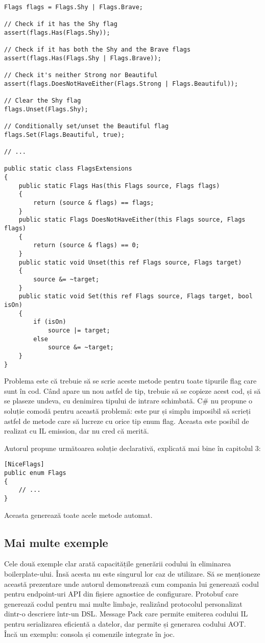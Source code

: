 \documentclass[a4paper,12pt]{report}
\begin{document}
\begin{verbatim}
Flags flags = Flags.Shy | Flags.Brave;

// Check if it has the Shy flag
assert(flags.Has(Flags.Shy));

// Check if it has both the Shy and the Brave flags
assert(flags.Has(Flags.Shy | Flags.Brave));

// Check it's neither Strong nor Beautiful
assert(flags.DoesNotHaveEither(Flags.Strong | Flags.Beautiful));

// Clear the Shy flag
flags.Unset(Flags.Shy);

// Conditionally set/unset the Beautiful flag
flags.Set(Flags.Beautiful, true);

// ...

public static class FlagsExtensions
{
    public static Flags Has(this Flags source, Flags flags)
    {
        return (source & flags) == flags;
    }
    public static Flags DoesNotHaveEither(this Flags source, Flags flags)
    {
        return (source & flags) == 0;
    }
    public static void Unset(this ref Flags source, Flags target)
    {
        source &= ~target;
    }
    public static void Set(this ref Flags source, Flags target, bool isOn)
    {
        if (isOn)
            source |= target;
        else
            source &= ~target;
    }
}
\end{verbatim}

Problema este că trebuie să se scrie aceste metode pentru toate tipurile flag care sunt în cod.
Când apare un nou astfel de tip, trebuie să se copieze acest cod, și să se plaseze undeva, cu denimirea tipului de intrare schimbată.
C\# nu propune o soluție comodă pentru această problemă: este pur și simplu imposibil să scrieți astfel de metode care să lucreze cu orice tip enum flag.
Aceasta este posibil de realizat cu IL emission, dar nu cred că merită.

Autorul propune următoarea soluție declarativă, explicată mai bine în capitolul 3:

\begin{verbatim}
[NiceFlags]
public enum Flags
{
    // ...
}
\end{verbatim}

Aceasta generează toate acele metode automat.

\subsection{Mai multe exemple}

Cele două exemple clar arată capacitățile generării codului în eliminarea boilerplate-ului.
Însă acesta nu este singurul lor caz de utilizare.
Să se menționeze această prezentare\cite{microservices_code_generation} unde autorul demonstrează cum compania lui generează codul pentru endpoint-uri \ac{API} din fișiere agnostice de configurare.
Protobuf\cite{protobuf} care generează codul pentru mai multe limbaje, realizând protocolul personalizat dintr-o descriere într-un \ac{DSL}.
Message Pack\cite{message_pack_github} care permite emiterea codului IL pentru serializarea eficientă a datelor, dar permite și generarea codului \ac{AOT}.
Încă un exemplu: consola și comenzile integrate în joc\cite{command_terminal}.
\end{document}
